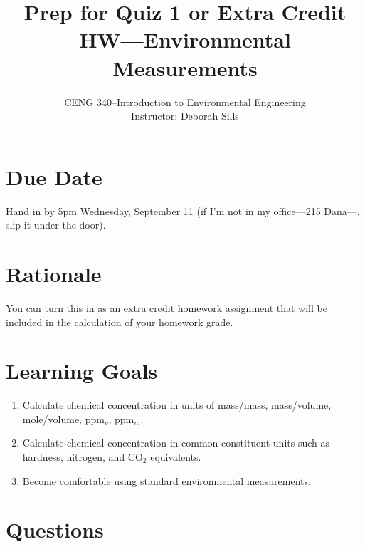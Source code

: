\documentclass[12pt,letterpaper]{article}
\begin{document}
\setlength{\parindent}{0cm} 


\frenchspacing

\title {Prep for Quiz 1 or Extra Credit HW---Environmental Measurements} 
\author {CENG 340--Introduction to Environmental Engineering\\
Instructor: Deborah Sills}
\maketitle

\section *{Due Date}
Hand in by 5pm Wednesday, September 11 (if I'm not in my office---215 Dana---, slip it under the door).

\section *{Rationale}
You can turn this in as an extra credit homework assignment that will be included in the calculation of your homework grade.\\

\section *{Learning Goals}
\begin{enumerate}
\item Calculate chemical concentration in units of mass/mass, mass/volume, mole/volume, ppm$_v$, ppm$_m$.
\item Calculate chemical concentration in common constituent units such as hardness, nitrogen, and CO$_2$ equivalents. 
\item Become comfortable using standard environmental measurements.
\end{enumerate}

\section *{Questions}
\end{document}
